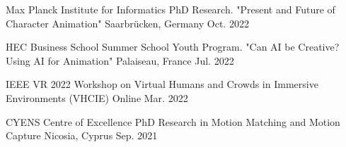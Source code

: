 

\begin{cventries}


\cvtalk
    {Max Planck Institute for Informatics} %
    {PhD Research. "Present and Future of Character Animation"} %
    {Saarbrücken, Germany} %
    {Oct. 2022} %

\cvtalk
    {HEC Business School} %
    {Summer School Youth Program. "Can AI be Creative? Using AI for Animation"} %
    {Palaiseau, France} %
    {Jul. 2022} %


\cvtalk
    {IEEE VR 2022} %
    {Workshop on Virtual Humans and Crowds in Immersive Environments (VHCIE)} %
    {Online} %
    {Mar. 2022} %


\cvtalk
    {CYENS Centre of Excellence} %
    {PhD Research in Motion Matching and Motion Capture} %
    {Nicosia, Cyprus} %
    {Sep. 2021} %



\end{cventries}

